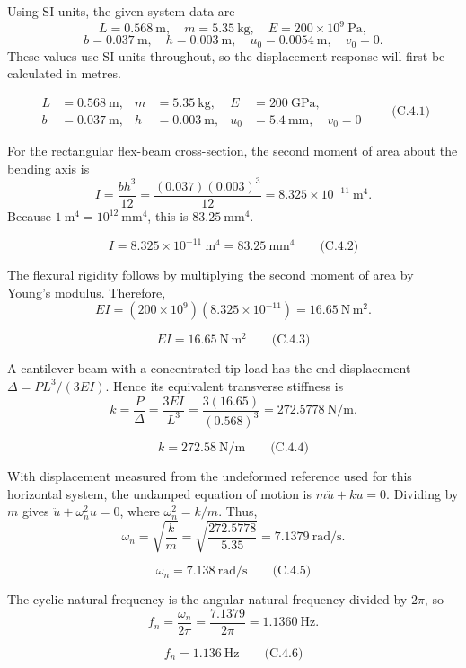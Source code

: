 Using SI units, the given system data are
\[
L=0.568\ \mathrm{m},\quad m=5.35\ \mathrm{kg},\quad E=200\times10^{9}\ \mathrm{Pa},
\]
\[
b=0.037\ \mathrm{m},\quad h=0.003\ \mathrm{m},\quad u_0=0.0054\ \mathrm{m},
\quad v_0=0.
\]
These values use SI units throughout, so the displacement response will first be calculated in metres.

\[
\boxed{\begin{aligned}
L&=0.568\ \mathrm{m}, &m&=5.35\ \mathrm{kg}, &E&=200\ \mathrm{GPa},\\
b&=0.037\ \mathrm{m}, &h&=0.003\ \mathrm{m}, &u_0&=5.4\ \mathrm{mm},\quad v_0=0
\end{aligned}}
\qquad\text{(C.4.1)}
\]

For the rectangular flex-beam cross-section, the second moment of area about the bending axis is
\[
I=\frac{bh^3}{12}
 =\frac{(0.037)(0.003)^3}{12}
 =8.325\times10^{-11}\ \mathrm{m^4}.
\]
Because \(1\ \mathrm{m^4}=10^{12}\ \mathrm{mm^4}\), this is \(83.25\ \mathrm{mm^4}\).

\[
\boxed{I=8.325\times10^{-11}\ \mathrm{m^4}=83.25\ \mathrm{mm^4}}
\qquad\text{(C.4.2)}
\]

The flexural rigidity follows by multiplying the second moment of area by Young's modulus. Therefore,
\[
EI=(200\times10^9)(8.325\times10^{-11})=16.65\ \mathrm{N\,m^2}.
\]

\[
\boxed{EI=16.65\ \mathrm{N\,m^2}}
\qquad\text{(C.4.3)}
\]

A cantilever beam with a concentrated tip load has the end displacement \(\Delta=PL^3/(3EI)\). Hence its equivalent transverse stiffness is
\[
k=\frac{P}{\Delta}=\frac{3EI}{L^3}
 =\frac{3(16.65)}{(0.568)^3}
 =272.5778\ \mathrm{N/m}.
\]

\[
\boxed{k=272.58\ \mathrm{N/m}}
\qquad\text{(C.4.4)}
\]

With displacement measured from the undeformed reference used for this horizontal system, the undamped equation of motion is \(m\ddot u+ku=0\). Dividing by \(m\) gives \(\ddot u+\omega_n^2u=0\), where \(\omega_n^2=k/m\). Thus,
\[
\omega_n=\sqrt{\frac{k}{m}}
 =\sqrt{\frac{272.5778}{5.35}}
 =7.1379\ \mathrm{rad/s}.
\]

\[
\boxed{\omega_n=7.138\ \mathrm{rad/s}}
\qquad\text{(C.4.5)}
\]

The cyclic natural frequency is the angular natural frequency divided by \(2\pi\), so
\[
f_n=\frac{\omega_n}{2\pi}=\frac{7.1379}{2\pi}=1.1360\ \mathrm{Hz}.
\]

\[
\boxed{f_n=1.136\ \mathrm{Hz}}
\qquad\text{(C.4.6)}
\]

